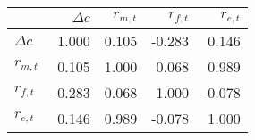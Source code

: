 \begin{tabular}{lrrrr}
\toprule
 & $\Delta c$ & $r_{m,t}$ & $r_{f,t}$ & $r_{e,t}$ \\
\midrule
$\Delta c$ & 1.000 & 0.105 & -0.283 & 0.146 \\
$r_{m,t}$ & 0.105 & 1.000 & 0.068 & 0.989 \\
$r_{f,t}$ & -0.283 & 0.068 & 1.000 & -0.078 \\
$r_{e,t}$ & 0.146 & 0.989 & -0.078 & 1.000 \\
\bottomrule
\end{tabular}
